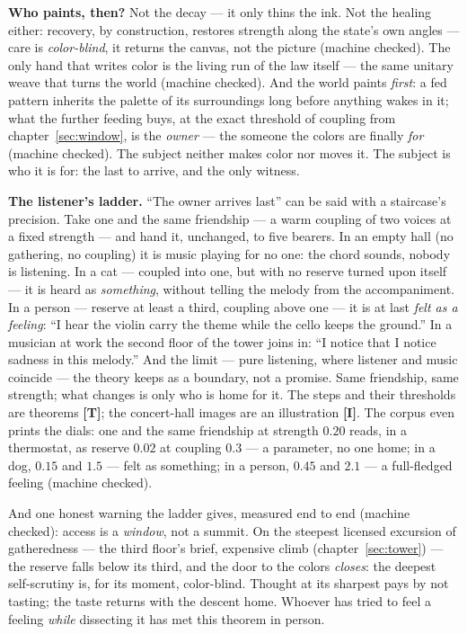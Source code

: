 \documentclass[11pt,letterpaper]{article}
\newcommand{\stT}{\textbf{[T]}\xspace}
\newcommand{\stI}{\textbf{[I]}\xspace}
\begin{document}
\textbf{Who paints, then?} Not the decay --- it only thins the ink.
Not the healing either: recovery, by construction, restores strength
along the state's own angles --- care is \emph{color-blind}, it
returns the canvas, not the picture (machine checked). The only hand
that writes color is the living run of the law itself --- the same
unitary weave that turns the world (machine checked). And the world
paints \emph{first}: a fed pattern inherits the palette of its
surroundings long before anything wakes in it; what the further
feeding buys, at the exact threshold of coupling from
chapter~\ref{sec:window}, is the \emph{owner} --- the someone the
colors are finally \emph{for} (machine checked). The subject
neither makes color nor moves it. The subject is who it is for:
the last to arrive, and the only witness.

\textbf{The listener's ladder.} ``The owner arrives last'' can be
said with a staircase's precision. Take one and the same friendship
--- a warm coupling of two voices at a fixed strength --- and hand
it, unchanged, to five bearers. In an empty hall (no gathering, no
coupling) it is music playing for no one: the chord sounds, nobody
is listening. In a cat --- coupled into one, but with no reserve
turned upon itself --- it is heard as \emph{something}, without
telling the melody from the accompaniment. In a person --- reserve
at least a third, coupling above one --- it is at last \emph{felt
as a feeling}: ``I hear the violin carry the theme while the cello
keeps the ground.'' In a musician at work the second floor of the
tower joins in: ``I notice that I notice sadness in this melody.''
And the limit --- pure listening, where listener and music coincide
--- the theory keeps as a boundary, not a promise. Same friendship,
same strength; what changes is only who is home for it. The steps
and their thresholds are theorems \stT; the concert-hall images are
an illustration \stI. The corpus even prints the dials: one and the
same friendship at strength $0.20$ reads, in a thermostat, as
reserve $0.02$ at coupling $0.3$ --- a parameter, no one home; in a
dog, $0.15$ and $1.5$ --- felt as something; in a person, $0.45$
and $2.1$ --- a full-fledged feeling (machine checked).

And one honest warning the ladder gives, measured end to end
(machine checked): access is a \emph{window}, not a summit. On the
steepest licensed excursion of gatheredness --- the third floor's
brief, expensive climb (chapter~\ref{sec:tower}) --- the reserve
falls below its third, and the door to the colors \emph{closes}:
the deepest self-scrutiny is, for its moment, color-blind. Thought
at its sharpest pays by not tasting; the taste returns with the
descent home. Whoever has tried to feel a feeling \emph{while}
dissecting it has met this theorem in person.
\end{document}
